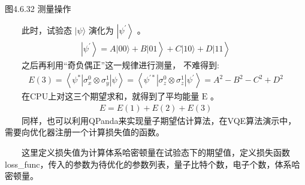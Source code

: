 \documentclass[a4paper,11pt,english]{sphinxmanual}
\begin{document}
\begin{center}图4.6.32 测量操作
\end{center}
\sphinxAtStartPar
  此时，试验态  \(|\psi\rangle\) 演化为  \(\left|\psi^{\prime}\right\rangle\) 。
\begin{equation*}
\begin{split}\left.\left.\left|\psi^{\prime}\right\rangle=A|00\rangle +B| 01\right\rangle+C|10\rangle +D| 11\right\rangle\end{split}
\end{equation*}
\sphinxAtStartPar
  之后再利用“奇负偶正”这一规律进行测量， 不难得到:
\begin{equation*}
\begin{split}E(3)=\left\langle\psi^{*}\left|\sigma_{x}^{0} \otimes \sigma_{y}^{1}\right| \psi\right\rangle=\left\langle\psi^{'*}\left|\sigma_{z}^{0} \otimes \sigma_{z}^{1}\right| \psi^{\prime}\right\rangle=A^{2}-B^{2}-C^{2}+D^{2}\end{split}
\end{equation*}
\sphinxAtStartPar
  在CPU上对这三个期望求和，就得到了平均能量  \(\mathrm{E}\) 。
\begin{equation*}
\begin{split}E=E(1)+E(2)+E(3)\end{split}
\end{equation*}
\sphinxAtStartPar
  同样，也可以利用QPanda来实现量子期望估计算法，在VQE算法演示中， 需要向优化器注册一个计算损失值的函数。

\sphinxAtStartPar
  这里定义损失值为计算体系哈密顿量在试验态下的期望值，定义损失函数 loss\_func，传入的参数为待优化的参数列表，量子比特个数，电子个数，体系哈密顿量。
\end{document}
